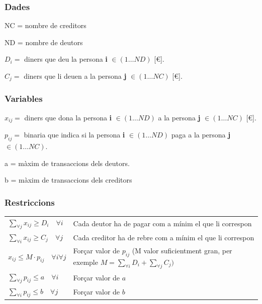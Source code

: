 \subsubsection{Dades}
\begin{description}
\item NC = nombre de creditors
\item ND = nombre de deutors
\item $D_{i}=$ diners que deu la persona \textbf{i} $\in (1 \ldots ND)$  [€].
\item $C_{j}=$ diners que li deuen a la persona \textbf{j} $\in (1 \ldots NC)$  [€].
\end{description}


\subsubsection{Variables}
\begin{description}
\item $x_{ij}=$ diners que dona la persona \textbf{i} $\in (1 \ldots ND)$ a la persona \textbf{j} $\in (1 \ldots NC)$  [€].
\item $p_{ij}=$ binaria que indica si la persona \textbf{i} $\in (1 \ldots ND)$ paga a la persona \textbf{j} $\in (1 \ldots NC)$.
\item a = màxim de transaccions dels deutors.
\item b = màxim de transaccions dels creditors
\end{description}

\subsubsection{Restriccions}
\begin{tabular}{l l}
$\sum\limits_{\forall j} x_{ij} \geq D_{i} \quad \forall i$ & Cada deutor ha de pagar com a mínim el que li correspon \\

$\sum\limits_{\forall i} x_{ij} \geq C_{j} \quad \forall j$ & Cada creditor ha de rebre com a mínim el que li correspon \\

$x_{ij} \leq M \cdot p_{ij} \quad \forall i \forall j$ & Forçar valor de $p_{ij}$ (M valor suficientment gran, per exemple $M=\sum\limits_{\forall i} D_{i} + \sum\limits_{\forall j} C_{j})$\\

$\sum\limits_{\forall j} p_{ij} \leq a \quad \forall i$ & Forçar valor de $a$ \\

$\sum\limits_{\forall i} p_{ij} \leq b \quad \forall j$ & Forçar valor de $b$ \\
\end{tabular}

